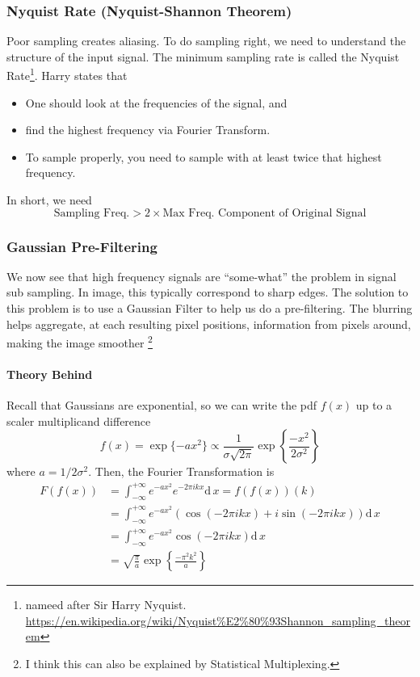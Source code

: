 \documentclass[11pt]{article}
\begin{document}
\subsubsection{Nyquist Rate (Nyquist-Shannon Theorem)}
Poor sampling creates aliasing. To do sampling right, we need to understand the structure of the input signal. The minimum sampling rate is called the Nyquist Rate\footnote{nameed after Sir Harry Nyquist. \url{https://en.wikipedia.org/wiki/Nyquist\%E2\%80\%93Shannon_sampling_theorem}}. Harry states that 
\begin{itemize}
	\item One should look at the frequencies of the signal, and
	\item find the highest frequency via Fourier Transform. 
	\item To sample properly, you need to sample with at least twice that highest frequency. 
\end{itemize}
In short, we need
\begin{equation}
	\text{Sampling Freq.} > 2 \times \text{Max Freq. Component of Original Signal}
\end{equation}

\subsubsection{Gaussian Pre-Filtering}
We now see that high frequency signals are ``some-what'' the problem in signal sub sampling. In image, this typically correspond to sharp edges. The solution to this problem is to use a Gaussian Filter to help us do a pre-filtering. The blurring helps aggregate, at each resulting pixel positions, information from pixels around, making the image smoother \footnote{I think this can also be explained by Statistical Multiplexing.} 

\paragraph{Theory Behind}
Recall that Gaussians are exponential, so we can write the pdf $f(x)$ up to a scaler multiplicand difference 
\begin{equation}
	f(x) = \exp\{-ax^2\} \propto \frac{1}{\sigma \sqrt {2 \pi }} \exp\left\{\frac{-x^2}{2\sigma^2} \right\}
\end{equation}
where $a = 1 / 2\sigma^2$. Then, the Fourier Transformation is
\begin{align}
	F(f(x)) 
	&= \int_{-\infty}^{+\infty} e^{-a x^{2}} e^{-2 \pi i k x} \mathrm d \, x = f(f(x)) (k) \\
	&= \int_{-\infty}^{+\infty} e^{-ax^2} \left( \cos ( -2\pi i k x ) + i\sin ( -2\pi i kx )\right) \mathrm d \, x \\
	&= \int_{-\infty}^{+\infty} e^{-ax^2} \cos ( -2\pi i k x ) \mathrm d \, x \\
	&= \sqrt{\frac{\pi}{a}} \exp \left\{ \frac{-\pi^2 k^2}{a} \right\} 
\end{align}
\end{document}
